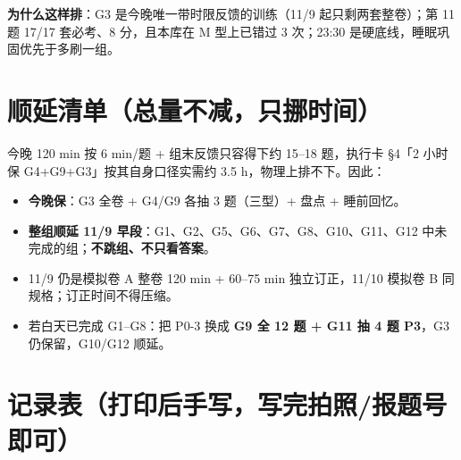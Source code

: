 \documentclass[11pt,a4paper]{ctexart}
\begin{document}
\noindent\textbf{为什么这样排}：G3 是今晚唯一带时限反馈的训练（11/9 起只剩两套整卷）；第 11 题 17/17 套必考、8 分，且本库在 M 型上已错过 3 次；23:30 是硬底线，睡眠巩固优先于多刷一组。

\section{顺延清单（总量不减，只挪时间）}

今晚 120 min 按 6 min/题 + 组末反馈只容得下约 15--18 题，执行卡 §4「2 小时保 G4+G9+G3」按其自身口径实需约 3.5 h，物理上排不下。因此：
\begin{itemize}
\item \textbf{今晚保}：G3 全卷 + G4/G9 各抽 3 题（三型）+ 盘点 + 睡前回忆。
\item \textbf{整组顺延 11/9 早段}：G1、G2、G5、G6、G7、G8、G10、G11、G12 中未完成的组；\textbf{不跳组、不只看答案}。
\item 11/9 仍是模拟卷 A 整卷 120 min + 60--75 min 独立订正，11/10 模拟卷 B 同规格；订正时间不得压缩。
\item 若白天已完成 G1--G8：把 P0-3 换成 \textbf{G9 全 12 题 + G11 抽 4 题 P3}，G3 仍保留，G10/G12 顺延。
\end{itemize}

\newpage
\section{记录表（打印后手写，写完拍照/报题号即可）}
\end{document}
